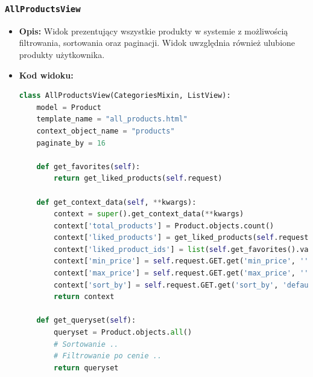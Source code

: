 \documentclass[12pt,a4paper,oneside]{article}
\theoremstyle{definition}
\numberwithin{equation}{section}
\begin{document}
\subsubsection*{\texttt{AllProductsView}}
    \begin{itemize}
        \item \textbf{Opis:} Widok prezentujący wszystkie produkty w systemie z możliwością filtrowania, sortowania oraz paginacji. Widok uwzględnia również ulubione produkty użytkownika.
        \item \textbf{Kod widoku:}
    \begin{lstlisting}[language=Python, caption=Kod widoku AllProductsView]
class AllProductsView(CategoriesMixin, ListView):
    model = Product
    template_name = "all_products.html"
    context_object_name = "products"
    paginate_by = 16

    def get_favorites(self):
        return get_liked_products(self.request)

    def get_context_data(self, **kwargs):
        context = super().get_context_data(**kwargs)
        context['total_products'] = Product.objects.count()
        context['liked_products'] = get_liked_products(self.request)
        context['liked_product_ids'] = list(self.get_favorites().values_list('id', flat=True))
        context['min_price'] = self.request.GET.get('min_price', '')
        context['max_price'] = self.request.GET.get('max_price', '')
        context['sort_by'] = self.request.GET.get('sort_by', 'default')
        return context

    def get_queryset(self):
        queryset = Product.objects.all()
        # Sortowanie ..
        # Filtrowanie po cenie ..
        return queryset
    \end{lstlisting}


\end{itemize}
\end{document}
